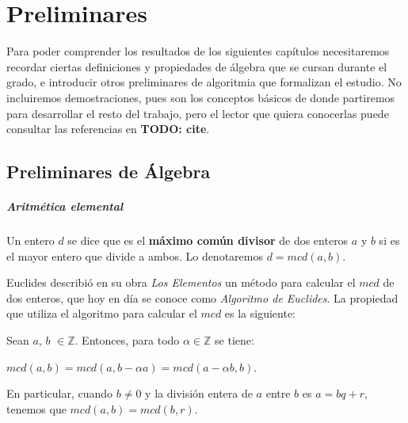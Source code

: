 \chapter{Preliminares}\label{ch:preliminares}


Para poder comprender los resultados de los siguientes capítulos necesitaremos recordar ciertas definiciones y propiedades de álgebra que se cursan durante el grado, e introducir otros preliminares de algoritmia que formalizan el estudio. No incluiremos demostraciones, pues son los conceptos básicos de donde partiremos para desarrollar el resto del trabajo, pero el lector que quiera conocerlas puede consultar las referencias en \textbf{TODO: cite}.

\section{Preliminares de Álgebra}


\paragraph{Aritmética elemental}

\begin{definition}
	Un entero $d$ se dice que es el \textbf{máximo común divisor} de dos enteros $a$ y $b$ si es el mayor entero que divide a ambos. Lo denotaremos $d=mcd(a,b)$.
\end{definition}

\hfil

Euclides describió en su obra \textit{Los Elementos} un método para calcular el $mcd$ de dos enteros, que hoy en día se conoce como \textit{Algoritmo de Euclides}. La propiedad que utiliza el algoritmo para calcular el $mcd$ es la siguiente:



\begin{proposition}
	Sean $a$, $b$ $\in \mathbb{Z}$. Entonces, para todo $\alpha \in \mathbb{Z}$ se tiene:
			\begin{center}
				$mcd(a,b) = mcd(a, b-\alpha a) = mcd(a-\alpha b, b).$
			\end{center}
	En particular, cuando $b \neq 0$ y la división entera de $a$ entre $b$ es $a = bq + r$, tenemos que $mcd(a,b) = mcd(b, r)$.
\end{proposition}

